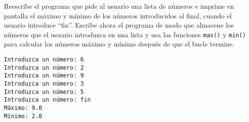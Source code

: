\begin{ex}
Reescribe el programa que pide al usuario una lista de números
e imprime en pantalla el máximo y mínimo de los números
introducidos al final, cuando el usuario introduce ``fin''.
Escribe ahora el programa de modo que almacene los números que el usuario
introduzca en una lista y usa las funciones {\tt max()} y {\tt min()} para
calcular los números máximo y mínimo después de que el
bucle termine.

\beforeverb
\begin{verbatim}
Introduzca un número: 6
Introduzca un número: 2
Introduzca un número: 9
Introduzca un número: 3
Introduzca un número: 5
Introduzca un número: fin
Máximo: 9.0
Mínimo: 2.0
\end{verbatim}
\afterverb
%

\end{ex}